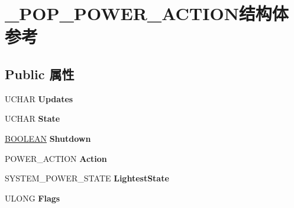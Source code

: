 \hypertarget{struct___p_o_p___p_o_w_e_r___a_c_t_i_o_n}{}\section{\+\_\+\+P\+O\+P\+\_\+\+P\+O\+W\+E\+R\+\_\+\+A\+C\+T\+I\+O\+N结构体 参考}
\label{struct___p_o_p___p_o_w_e_r___a_c_t_i_o_n}
\subsection*{Public 属性}
\begin{DoxyCompactItemize}
\item 
\mbox{\label{struct___p_o_p___p_o_w_e_r___a_c_t_i_o_n_a1020dd485776147611df256738cc7573}} 
U\+C\+H\+AR {\bfseries Updates}
\item 
\mbox{\label{struct___p_o_p___p_o_w_e_r___a_c_t_i_o_n_a866f77604d621d7a56b4de77bcff19cc}} 
U\+C\+H\+AR {\bfseries State}
\item 
\mbox{\label{struct___p_o_p___p_o_w_e_r___a_c_t_i_o_n_aa2886cead75337c4503c6698e1721bc5}} 
\hyperlink{_processor_bind_8h_a112e3146cb38b6ee95e64d85842e380a}{B\+O\+O\+L\+E\+AN} {\bfseries Shutdown}
\item 
\mbox{\label{struct___p_o_p___p_o_w_e_r___a_c_t_i_o_n_a92ca1928b44aa44d9c0635b732c10f8d}} 
P\+O\+W\+E\+R\+\_\+\+A\+C\+T\+I\+ON {\bfseries Action}
\item 
\mbox{\label{struct___p_o_p___p_o_w_e_r___a_c_t_i_o_n_a55bd256bd8af65cb3f24faa8227b735f}} 
S\+Y\+S\+T\+E\+M\+\_\+\+P\+O\+W\+E\+R\+\_\+\+S\+T\+A\+TE {\bfseries Lightest\+State}
\item 
\mbox{\label{struct___p_o_p___p_o_w_e_r___a_c_t_i_o_n_a4695c7975c6e82b0a0a9e1755e4c9398}} 
U\+L\+O\+NG {\bfseries Flags}
\item 
\mbox{\label{struct___p_o_p___p_o_w_e_r___a_c_t_i_o_n_aa753d6ea84a65381b96174bcd8228e31}} 

\end{DoxyCompactItemize}
